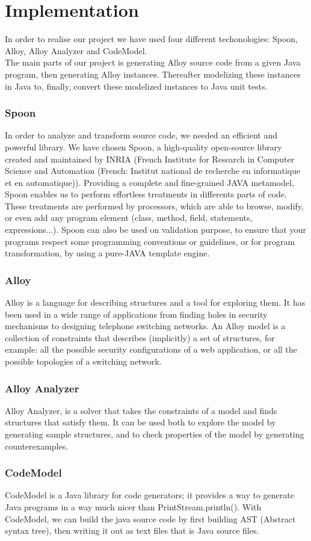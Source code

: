 \section{Implementation}
\label{sec:Implementation}
In order to realise our project we have used four different techonologies: Spoon, Alloy, Alloy Analyzer and CodeModel.\\
The main parts of our project is generating Alloy source code from a given Java program, then generating Alloy instances. Thereafter modelizing these instances in Java to, finally, convert these modelized instances to Java unit tests.

\subsubsection{Spoon}
\label{subsec:impl}
In order to analyze and transform source code, we needed an efficient and powerful library.
We have chosen Spoon, a high-quality open-source library created and maintained by INRIA
(French Institute for Research in Computer Science and Automation (French: Institut national
de recherche en informatique et en automatique)). Providing a complete and fine-grained
JAVA metamodel, Spoon enables us to perform effortless treatments in differents parts of code.
These treatments are performed by processors, which are able to browse, modify, or even add
any program element (class, method, field, statements, expressions...).\cite{spoon-gforge}\cite{spoon-hal}
Spoon can also be used on validation purpose, to ensure that your programs respect some
programming conventions or guidelines, or for program transformation, by using a pure-JAVA
template engine.\cite{spoon-javasource}
\subsubsection{Alloy}
Alloy is a language for describing structures and a tool for exploring them. It has been used in a wide range of applications from finding holes in security mechanisms to designing telephone switching networks.
An Alloy model is a collection of constraints that describes (implicitly) a set of structures, for example: all the possible security configurations of a web application, or all the possible topologies of a switching network.\cite{alloy}

\subsubsection{Alloy Analyzer}
Alloy Analyzer, is a solver that takes the constraints of a model and finds structures that satisfy them. It can be used both to explore the model by generating sample structures, and to check properties of the model by generating counterexamples.\cite{alloy}

\subsubsection{CodeModel}
CodeModel is a Java library for code generators; it provides a way to generate Java programs in a way much nicer than PrintStream.println().
With CodeModel, we can build the java source code by first building AST (Abstract syntax tree)\cite{ast}, then writing it out as text files that is Java source files.\cite{codeModel}